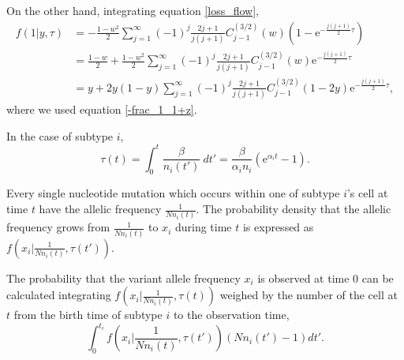 \documentclass[12pt]{article}
\newcommand{\napier}{\mathrm{e}}
\begin{document}
On the other hand, integrating equation \eqref{loss_flow},
\begin{align}
 f(1|y,\tau) & = - \frac{1-w^2}{2} \sum_{j=1}^{\infty} (-1)^j \frac{2j+1}{j(j+1)} C^{(3/2)}_{j-1} (w) \left(1 - \napier^{-\frac{j(j+1)}{2}\tau} \right)\\
 & = \frac{1-w}{2} + \frac{1-w^2}{2} \sum_{j=1}^{\infty} (-1)^j \frac{2j+1}{j(j+1)} C^{(3/2)}_{j-1} (w) \napier^{-\frac{j(j+1)}{2}\tau}\\
 & = y + 2y(1-y) \sum_{j=1}^{\infty} (-1)^j \frac{2j+1}{j(j+1)} C^{(3/2)}_{j-1} (1-2y) \napier^{-\frac{j(j+1)}{2}\tau},\label{loss}
\end{align}
where we used equation \eqref{-frac_1_1+z}.

In the case of subtype $i$,
\begin{equation}
 \tau(t) = \int_{0}^{t} \frac{\beta}{n_i(t')} \: dt' = \frac{\beta}{\alpha_i n_i}\left(\napier^{\alpha_i t} - 1\right).
\end{equation}

Every single nucleotide mutation which occurs within one of subtype $i$'s cell at time $t$ have the allelic frequency $\frac{1}{Nn_i(t)}$.
The probability density that the allelic frequency grows from $\frac{1}{Nn_i(t)}$ to $x_i$ during time $t$ is expressed as $f(x_i| \frac{1}{Nn_i(t)}, \tau(t'))$.

The probability that the variant allele frequency $x_i$ is observed at time 0 can be calculated integrating $f\left(x_i| \frac{1}{Nn_i(t)}, \tau(t)\right)$ weighed by the number of the cell at $t$ from the birth time of subtype $i$ to the observation time,
\begin{equation}
 \int_{0}^{t_i} f\left(x_i| \frac{1}{Nn_i(t)}, \tau(t')\right) (Nn_i(t')-1)  dt'.\label{vaf_dist_unnorm}
\end{equation}
\end{document}
